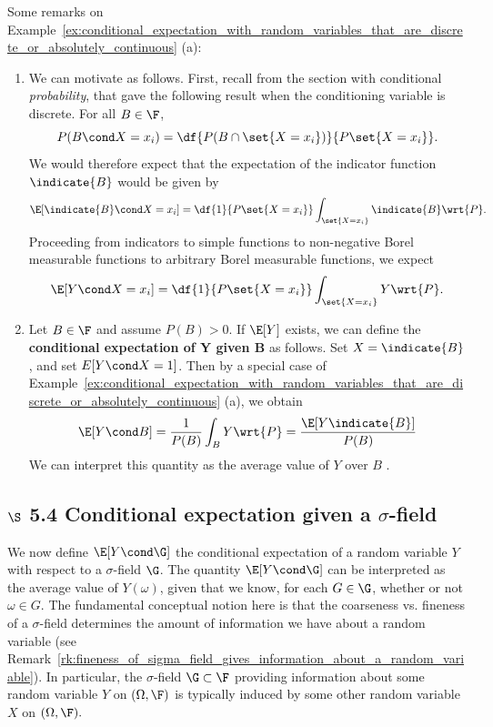 \documentclass{article} %
\begin{document}
\begin{remark}
Some remarks on Example~\ref{ex:conditional_expectation_with_random_variables_that_are_discrete_or_absolutely_continuous} (a):
\begin{enumerate}
\item We can motivate  as follows.  First, recall from the section with conditional \textit{probability}, that   gave the following result when the conditioning variable is discrete.  For all $B \in \F$,
\[ P(B \cond X=x_i) = \df{P(B \cap \set{X=x_i})}{P\set{X=x_i}}.\]
We would therefore expect that the expectation of the indicator function $\indicate{B}$ would be given by 
\[ \E[\indicate{B} \cond X=x_i] = \df{1}{P\set{X=x_i}} \int_{\set{X=x_i}} \indicate{B} \wrt{P}.\]
Proceeding from indicators to simple functions to non-negative Borel measurable functions to arbitrary Borel measurable functions, we expect
\[ \E[Y \cond X=x_i] = \df{1}{P\set{X=x_i}} \int_{\set{X=x_i}} Y \wrt{P}.\]
\item Let $B \in \F$ and assume $P(B)>0$.  If $\E[Y]$ exists, we can define the \textbf{conditional expectation of Y given B} as follows.  Set $X=\indicate{B}$, and set $E[Y \cond X=1]$.  Then by a special case of Example~\ref{ex:conditional_expectation_with_random_variables_that_are_discrete_or_absolutely_continuous} (a), we obtain 
\[ \E[Y \cond B] = \frac{1}{P(B)} \int_B Y \wrt{P}  = \frac{\E[Y \indicate{B}]}{P(B)} \]
We can interpret this quantity as the average value of $Y$ over $B$ \cite[pp.224]{durrett2010probability}.
\end{enumerate}
\end{remark}


\subsection{$\S$ 5.4 Conditional expectation given a $\sigma$-field}

We now define $\E[Y \cond \G]$ the conditional expectation of a random variable $Y$ with respect to a $\sigma$-field $\G$.   The quantity $\E[Y \cond \G]$ can be interpreted as the average value of $Y(\omega)$, given that we know, for each $G \in \G$, whether or not $\omega \in G$. The fundamental conceptual notion here is that the coarseness vs. fineness of a $\sigma$-field determines the amount of information we have about a random variable (see Remark~\ref {rk:fineness_of_sigma_field_gives_information_about_a_random_variable}).  In particular, the $\sigma$-field $\G \subset \F$ providing information about some random variable $Y$ on $(\Omega, \F)$ is typically induced by some other random variable $X$ on $(\Omega,\F).$
\end{document}
